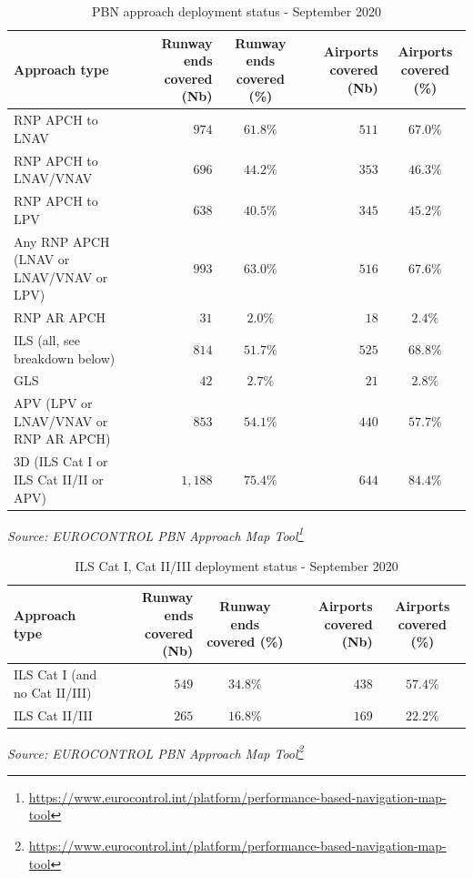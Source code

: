 \documentclass[
  11pt,
  a4paper,
]{book}
\DeclareRobustCommand{\href}[2]{#2\footnote{\url{#1}}}
\begin{document}
\hypertarget{tbl-pbn-deployment}{}
\setlength{\LTpost}{0mm}
\begin{longtable}{lrcrc}
\caption{\label{tbl-pbn-deployment}PBN approach deployment status - September 2020 }\tabularnewline

\toprule
Approach type & Runway ends covered (Nb) & Runway ends covered (\%) & Airports covered (Nb) & Airports covered (\%) \\ 
\midrule
RNP APCH to LNAV & $974$ & $61.8\%$ & $511$ & $67.0\%$ \\ 
RNP APCH to LNAV/VNAV & $696$ & $44.2\%$ & $353$ & $46.3\%$ \\ 
RNP APCH to LPV & $638$ & $40.5\%$ & $345$ & $45.2\%$ \\ 
Any RNP APCH (LNAV or LNAV/VNAV or LPV) & $993$ & $63.0\%$ & $516$ & $67.6\%$ \\ 
RNP AR APCH & $31$ & $2.0\%$ & $18$ & $2.4\%$ \\ 
ILS (all, see breakdown below) & $814$ & $51.7\%$ & $525$ & $68.8\%$ \\ 
GLS & $42$ & $2.7\%$ & $21$ & $2.8\%$ \\ 
APV (LPV or LNAV/VNAV or RNP AR APCH) & $853$ & $54.1\%$ & $440$ & $57.7\%$ \\ 
3D (ILS Cat I or ILS Cat II/II or APV) & $1,188$ & $75.4\%$ & $644$ & $84.4\%$ \\ 
\bottomrule
\end{longtable}
\begin{minipage}{\linewidth}
\emph{Source: \href{https://www.eurocontrol.int/platform/performance-based-navigation-map-tool}{EUROCONTROL PBN Approach Map Tool}}\\
\end{minipage}

\hypertarget{tbl-ils-deployment}{}
\setlength{\LTpost}{0mm}
\begin{longtable}{lrcrc}
\caption{\label{tbl-ils-deployment}ILS Cat I, Cat II/III deployment status - September 2020 }\tabularnewline

\toprule
Approach type & Runway ends covered (Nb) & Runway ends covered (\%) & Airports covered (Nb) & Airports covered (\%) \\ 
\midrule
ILS Cat I (and no Cat II/III) & $549$ & $34.8\%$ & $438$ & $57.4\%$ \\ 
ILS Cat II/III & $265$ & $16.8\%$ & $169$ & $22.2\%$ \\ 
\bottomrule
\end{longtable}
\begin{minipage}{\linewidth}
\emph{Source: \href{https://www.eurocontrol.int/platform/performance-based-navigation-map-tool}{EUROCONTROL PBN Approach Map Tool}}\\
\end{minipage}
\end{document}
